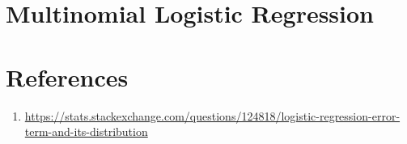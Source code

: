 \section{Multinomial Logistic Regression}

\section{References}
\begin{enumerate}
    \item \url{https://stats.stackexchange.com/questions/124818/logistic-regression-error-term-and-its-distribution}
\end{enumerate}


